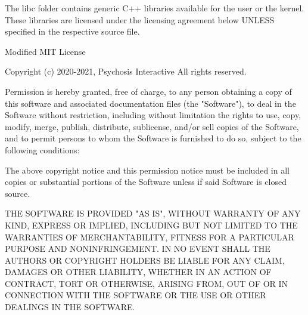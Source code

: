 The libc folder contains generic C++ libraries available for the user or the kernel. These libraries are licensed under the licensing agreement below U\+N\+L\+E\+SS specified in the respective source file.


\begin{DoxyCode}
Modified MIT License

Copyright (c) 2020-2021, Psychosis Interactive All rights reserved.

Permission is hereby granted, free of charge, to any person obtaining a copy of this software and
       associated documentation files (the "Software"), to deal in the Software without restriction, including without
       limitation the rights to use, copy, modify, merge, publish, distribute, sublicense, and/or sell copies of the
       Software, and to permit persons to whom the Software is furnished to do so, subject to the following
       conditions:

The above copyright notice and this permission notice must be included in all copies or substantial
       portions of the Software unless if said Software is closed source.

THE SOFTWARE IS PROVIDED "AS IS", WITHOUT WARRANTY OF ANY KIND, EXPRESS OR IMPLIED, INCLUDING BUT NOT
       LIMITED TO THE WARRANTIES OF MERCHANTABILITY, FITNESS FOR A PARTICULAR PURPOSE AND NONINFRINGEMENT. IN NO EVENT
       SHALL THE AUTHORS OR COPYRIGHT HOLDERS BE LIABLE FOR ANY CLAIM, DAMAGES OR OTHER LIABILITY, WHETHER IN AN
       ACTION OF CONTRACT, TORT OR OTHERWISE, ARISING FROM, OUT OF OR IN CONNECTION WITH THE SOFTWARE OR THE USE OR
       OTHER DEALINGS IN THE SOFTWARE.
\end{DoxyCode}
 